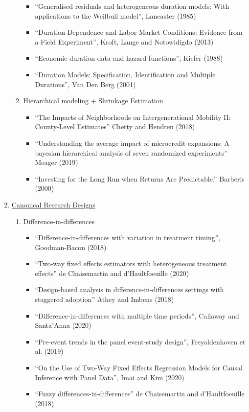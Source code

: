 \documentclass[11pt, a4paper]{article}
\begin{document}
\begin{enumerate}
\begin{enumerate}
\begin{itemize}
    \item ``Generalised residuals and heterogeneous duration models: With applications to the Weilbull model'', Lancaster (1985)
    \item ``Duration Dependence and Labor Market Conditions: Evidence from a Field Experiment'', Kroft, Lange and Notowidigdo (2013)
    \item ``Economic duration data and hazard functions'', Kiefer (1988)
    \item ``Duration Models: Specification, Identification and Multiple Durations'', Van Den Berg (2001)
    \end{itemize}
  \item Hierarchical modeling + Shrinkage Estimation
    \begin{itemize}
    \item ``The Impacts of Neighborhoods on Intergenerational Mobility II: County-Level Estimates'' Chetty and Hendren (2018)
    \item ``Understanding the average impact of microcredit expansions: A bayesian hierarchical analysis of seven randomized experiments'' Meager (2019)
    \item ``Investing for the Long Run when Returns Are Predictable.'' Barberis (2000)
    \end{itemize}
  \end{enumerate}
\item  \underline{Canonical Research Designs}
  \begin{enumerate}
  \item Difference-in-differences
    \begin{itemize}
    \item ``Difference-in-differences with variation in treatment timing'', Goodman-Bacon (2018)
    \item ``Two-way fixed effects estimators with heterogeneous treatment effects'' de Chaisemartin and d'Haultfoeuille (2020)
    \item ``Design-based analysis in difference-in-differences settings with staggered adoption'' Athey and Imbens (2018)
    \item ``Difference-in-differences with multiple time periods'', Callaway and Santa'Anna (2020)
    \item ``Pre-event trends in the panel event-study design'', Freyaldenhoven et al. (2019)
    \item ``On the Use of Two-Way Fixed Effects Regression Models for Causal Inference with Panel Data'', Imai and Kim (2020)
    \item ``Fuzzy differences-in-differences'' de Chaisemartin and d'Haultfoeuille (2018)

\end{itemize}
\end{enumerate}
\end{enumerate}
\end{document}

